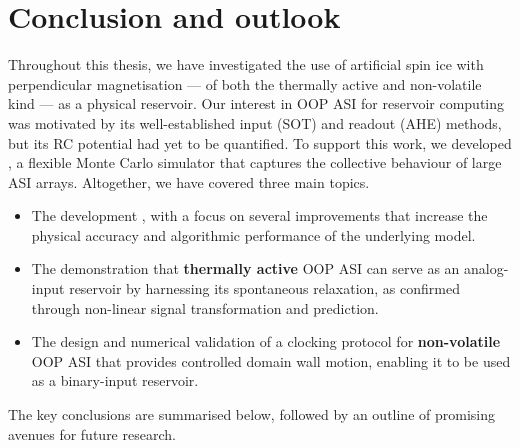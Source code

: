 \chapter{Conclusion and outlook}\label{ch:Conclusion}

Throughout this thesis, we have investigated the use of artificial spin ice with perpendicular magnetisation --- of both the thermally active and non-volatile kind --- as a physical reservoir.
Our interest in OOP ASI for reservoir computing was motivated by its well-established input (SOT) and readout (AHE) methods, but its RC potential had yet to be quantified.
To support this work, we developed \hotspice, a flexible Monte Carlo simulator that captures the collective behaviour of large ASI arrays.
Altogether, we have covered three main topics.
\begin{itemize}
	\item The development \textbf{\hotspice}, with a focus on several improvements that increase the physical accuracy and algorithmic performance of the underlying model.
	\item The demonstration that \textbf{thermally active} OOP ASI can serve as an analog-input reservoir by harnessing its spontaneous relaxation, as confirmed through non-linear signal transformation and prediction.
	\item The design and numerical validation of a clocking protocol for \textbf{non-volatile} OOP ASI that provides controlled domain wall motion, enabling it to be used as a binary-input reservoir.
\end{itemize}
The key conclusions are summarised below, followed by an outline of promising avenues for future research.

\newpage
